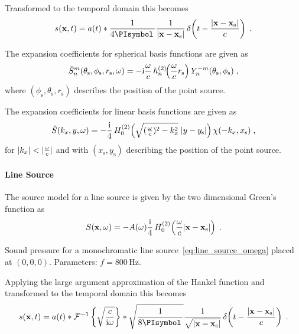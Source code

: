 Transformed to the temporal domain this becomes
%
\begin{equation}
    s(\x,t) = a(t) * \frac{1}{4\PI} \frac{1}{|\x-\xs|}
    \deltafunc{t - \frac{|\x-\xs|}{c}}
    \qp
    \label{point_source_t}
\end{equation}
%

The expansion coefficients for spherical basis functions are given
as\autocite[][(2.37)]{Ahrens2012}
%
\begin{equation}
    \breve{S}_n^m(\theta_\text{s},\phi_\text{s},r_\text{s},\omega) =
    -\I \omegac \, h_n^{(2)}\!\!\left(\omegac r_\text{s}\right)
    Y_n^{-m}(\theta_\text{s},\phi_\text{s}) \qc
    \label{eq:point_source_spherical}
\end{equation}
%
where $(\phi_\text{s},\theta_\text{s},r_\text{s})$ describes the position of the
point source.

The expansion coefficients for linear basis functions are given
as\autocite[][(C.10)]{Ahrens2012}
%
\begin{equation}
    \breve{S}(k_x,y,\omega) =
    -\frac{\I}{4} \H{0}{2} \left( \sqrt{(\tfrac{\omega}{c})^2-k_x^2} \;
        |y-y_\text{s}| \right) \chi(-k_x,x_\text{s}) \qc
    \label{eq:point_source_linear}
\end{equation}
%
for $|k_x|<|\omegac|$ and with $(x_\text{s},y_\text{s})$ describing the position
of the point source.


\paragraph{Line Source}
\label{sec:line_source}
%
The source model for a line source is given by the two dimensional Green's
function as
%
\begin{equation}
    S(\x,\omega) = -A(\omega) \frac{\I}{4} \H{0}{2} \left(\omegac |\x-\xs|\right)
    \qp
    \label{eq:line_source_omega}
\end{equation}
%
\begin{marginfigure}
    \centering
    \ft
    
    \caption{Sound pressure for a monochromatic line
        source~\eqref{eq:line_source_omega} placed at $(0,0,0)$. Parameters: $f =
        800$\,Hz.
        }
\end{marginfigure}
%
Applying the large argument approximation of the Hankel
function and transformed to
the temporal domain this becomes
%
\begin{equation}
    s(\x,t) = a(t) * \IFT{\sqrt{\frac{c}{\I\omega}}} * \sqrt{\frac{1}{8\PI}} \frac{1}{\sqrt{|\x-\xs|}}
    \deltafunc{t - \frac{|\x-\xs|}{c}}
    \qp
    \label{line_source_t}
\end{equation}
%

